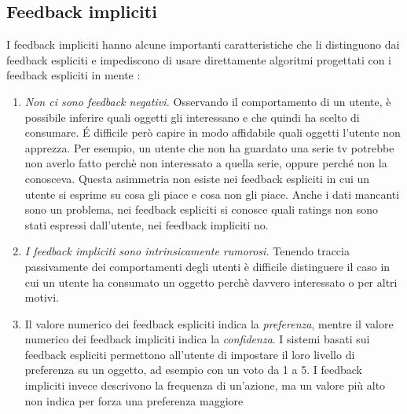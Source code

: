 \documentclass[12pt,italian]{report}
\begin{document}
\subsection{Feedback impliciti}
I feedback impliciti hanno alcune importanti caratteristiche che li distinguono dai feedback espliciti e impediscono di usare direttamente algoritmi progettati con i feedback espliciti in mente \cite{als}:
\begin{enumerate}
 \item \textit{Non ci sono feedback negativi.} Osservando il comportamento di un utente, è possibile inferire quali oggetti gli interessano e che quindi ha scelto di consumare. \'E difficile però capire in modo affidabile quali oggetti l'utente non apprezza. Per esempio, un utente che non ha guardato una serie tv potrebbe non averlo fatto perchè non interessato a quella serie, oppure perché non la conosceva. Questa asimmetria non esiste nei feedback espliciti in cui un utente si esprime su cosa gli piace e cosa non gli piace. Anche i dati mancanti sono un problema, nei feedback espliciti si conosce quali ratings non sono stati espressi dall'utente, nei feedback impliciti no.
 
 \item \textit{I feedback impliciti sono intrinsicamente rumorosi.} Tenendo traccia passivamente dei comportamenti degli utenti è difficile distinguere il caso in cui un utente ha consumato un oggetto perchè davvero interessato o per altri motivi.
 
 \item Il valore numerico dei feedback espliciti indica la \textit{preferenza}, mentre il valore numerico dei feedback impliciti indica la \textit{confidenza}. I sistemi basati sui feedback espliciti permettono all'utente di impostare il loro livello di preferenza su un oggetto, ad esempio con un voto da 1 a 5. I feedback impliciti invece descrivono la frequenza di un'azione, ma un valore più alto  non indica per forza una preferenza maggiore
\end{enumerate}
\end{document}
